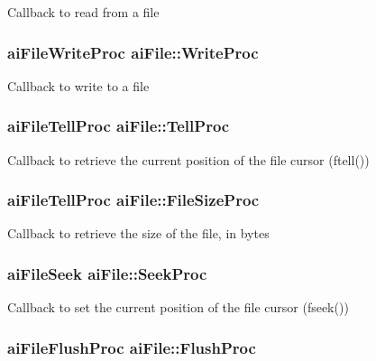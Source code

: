 Callback to read from a file \hypertarget{structai_file_b9fca3a62e34a33592c13a6f31db7d1d}{
\subsubsection[WriteProc]{\setlength{\rightskip}{0pt plus 5cm}aiFileWriteProc {\bf aiFile::WriteProc}}}
\label{structai_file_b9fca3a62e34a33592c13a6f31db7d1d}


Callback to write to a file \hypertarget{structai_file_af2d88a3b2fcbdacf51119658283d27e}{
\subsubsection[TellProc]{\setlength{\rightskip}{0pt plus 5cm}aiFileTellProc {\bf aiFile::TellProc}}}
\label{structai_file_af2d88a3b2fcbdacf51119658283d27e}


Callback to retrieve the current position of the file cursor (ftell()) \hypertarget{structai_file_ff2fff8c0458e7ec71f7de217c3a3033}{
\subsubsection[FileSizeProc]{\setlength{\rightskip}{0pt plus 5cm}aiFileTellProc {\bf aiFile::FileSizeProc}}}
\label{structai_file_ff2fff8c0458e7ec71f7de217c3a3033}


Callback to retrieve the size of the file, in bytes \hypertarget{structai_file_7a07b499be4ad433669246479a4d4ad2}{
\subsubsection[SeekProc]{\setlength{\rightskip}{0pt plus 5cm}aiFileSeek {\bf aiFile::SeekProc}}}
\label{structai_file_7a07b499be4ad433669246479a4d4ad2}


Callback to set the current position of the file cursor (fseek()) \hypertarget{structai_file_1102d28d1c0be68ffed20476669bdb0d}{
\subsubsection[FlushProc]{\setlength{\rightskip}{0pt plus 5cm}aiFileFlushProc {\bf aiFile::FlushProc}}}
\label{structai_file_1102d28d1c0be68ffed20476669bdb0d}


